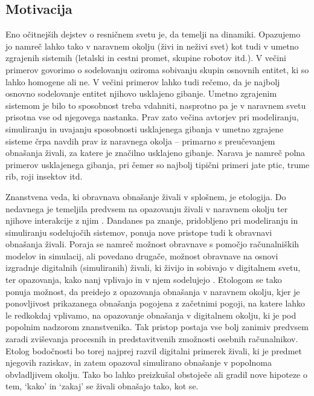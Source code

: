 









\begin{razsirjeniPovzetek}


\section{Motivacija}
Eno očitnejših dejstev o resničnem svetu je, da temelji na dinamiki. Opazujemo jo namreč lahko tako v naravnem okolju (živi in neživi svet) kot tudi v umetno zgrajenih sistemih (letalski in cestni promet, skupine robotov itd.). V večini primerov govorimo o sodelovanju oziroma sobivanju skupin osnovnih entitet, ki so lahko homogene ali ne. V večini primerov lahko tudi rečemo, da je najbolj osnovno sodelovanje entitet njihovo usklajeno gibanje. Umetno zgrajenim sistemom je bilo to sposobnost treba vdahniti, nasprotno pa je v naravnem svetu prisotna vse od njegovega nastanka. Prav zato večina avtorjev \cite{bonabeau:1999, braitenberg:1984,jadbabaie:2003,mataric:1995} pri modeliranju, simuliranju in uvajanju sposobnosti usklajenega gibanja v umetno zgrajene sisteme črpa navdih prav iz naravnega okolja -- primarno s preučevanjem obnašanja živali, za katere je značilno usklajeno gibanje. Narava je namreč polna primerov usklajenega gibanja, pri čemer so najbolj tipični primeri jate ptic, trume rib, roji insektov itd.

Znanstvena veda, ki obravnava obnašanje živali v splošnem, je etologija. Do nedavnega je temeljila predvsem na opazovanju živali v naravnem okolju ter njihove interakcije z njim \cite{watts:1998}. Dandanes pa znanje, pridobljeno pri modeliranju in simuliranju sodelujočih sistemov, ponuja nove pristope tudi k obravnavi obnašanja živali. Poraja se namreč možnost obravnave s pomočjo računalniških modelov in simulacij, ali povedano drugače, možnost obravnave na osnovi izgradnje digitalnih (simuliranih) živali, ki živijo in sobivajo v digitalnem svetu, ter opazovanja, kako nanj vplivajo in v njem sodelujejo \cite{bentley:2002}. Etologom se tako ponuja možnost, da preidejo z opazovanja obnašanja v naravnem okolju, kjer je ponovljivost prikazanega obnašanja pogojena z začetnimi pogoji, na katere lahko le redkokdaj vplivamo, na opazovanje obnašanja v digitalnem okolju, ki je pod popolnim nadzorom znanstvenika. Tak pristop postaja vse bolj zanimiv predvsem zaradi zviševanja procesnih in predstavitvenih zmožnosti osebnih računalnikov. Etolog bodočnosti bo torej najprej razvil digitalni primerek živali, ki je predmet njegovih raziskav, in zatem opazoval simulirano obnašanje v popolnoma obvladljivem okolju. Tako bo lahko preizkušal obstoječe ali gradil nove hipoteze o tem, `kako' in `zakaj' se živali obnašajo tako, kot se.


\end{razsirjeniPovzetek}
